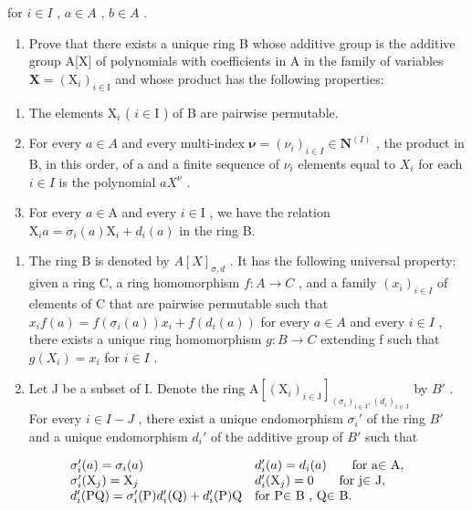for \(i \in I\) , \(a \in A\) , \(b \in A\) .

\begin{enumerate}
\def\labelenumi{\alph{enumi})}
\tightlist
\item
  Prove that there exists a unique ring B whose additive group is the additive group A{[}X{]} of polynomials with coefficients in A in the family of variables \(\mathbf{X} = (\mathrm{X}_{i})_{i \in \mathrm{I}}\) and whose product has the following properties:
\end{enumerate}

\begin{enumerate}
\def\labelenumi{(\roman{enumi})}
\item
  The elements \(\mathrm{X}_i\) ( \(i \in \mathrm{I}\) ) of B are pairwise permutable.
\item
  For every \(a \in A\) and every multi-index \(\boldsymbol{\nu} = (\nu_i)_{i \in I} \in \mathbf{N}^{(I)}\) , the product in B, in this order, of a and a finite sequence of \(\nu_i\) elements equal to \(X_i\) for each \(i \in I\) is the polynomial \(aX^\nu\) .
\item
  For every \(a \in \mathrm{A}\) and every \(i \in \mathrm{I}\) , we have the relation \(\mathrm{X}_i a = \sigma_i(a)\mathrm{X}_i + d_i(a)\) in the ring B.
\end{enumerate}

\begin{enumerate}
\def\labelenumi{\alph{enumi})}
\setcounter{enumi}{1}
\item
  The ring B is denoted by \(A[X]_{\sigma,d}\) . It has the following universal property: given a ring C, a ring homomorphism \(f: A \to C\) , and a family \((x_i)_{i \in I}\) of elements of C that are pairwise permutable such that \(x_i f(a) = f(\sigma_i(a)) x_i + f(d_i(a))\) for every \(a \in A\) and every \(i \in I\) , there exists a unique ring homomorphism \(g: B \to C\) extending f such that \(g(X_i) = x_i\) for \(i \in I\) .
\item
  Let J be a subset of I. Denote the ring \(\mathrm{A}[(\mathrm{X}_{i})_{i\in\mathrm{J}}]_{(\sigma_{i})_{i\in\mathrm{J}},(d_{i})_{i\in\mathrm{J}}}\) by \(B'\) . For every \(i\in I-J\) , there exist a unique endomorphism \(\sigma_{i}'\) of the ring \(B'\) and a unique endomorphism \(d_{i}'\) of the additive group of \(B'\) such that
\end{enumerate}

\[
\begin{array}{l l} \sigma_ {i} ^ {\prime} (a) = \sigma_ {i} (a) & d _ {i} ^ {\prime} (a) = d _ {i} (a) \qquad \text {for a\ensuremath{\in} A}, \\ \sigma_ {i} ^ {\prime} (\mathrm{X} _ {j}) = \mathrm{X} _ {j} & d _ {i} ^ {\prime} (\mathrm{X} _ {j}) = 0 \qquad \text {for j\ensuremath{\in} J}, \\ d _ {i} ^ {\prime} (\mathrm{PQ}) = \sigma_ {i} ^ {\prime} (\mathrm{P}) d _ {i} ^ {\prime} (\mathrm{Q}) + d _ {i} ^ {\prime} (\mathrm{P}) \mathrm{Q} & \text {for P\ensuremath{\in} B , Q\ensuremath{\in} B}. \end{array}
\]


